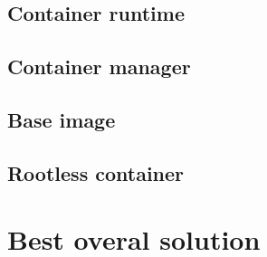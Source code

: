 \subsection{Container runtime}



\subsection{Container manager}

\subsection{Base image}

\subsection{Rootless container}

\section{Best overal solution}

